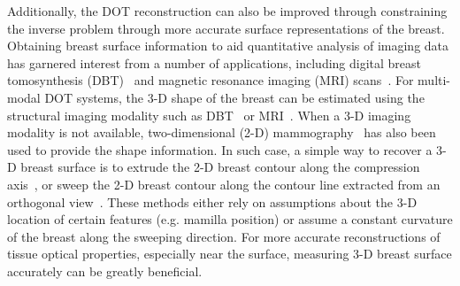 Additionally, the DOT reconstruction can also be improved through constraining the inverse problem through more accurate surface representations of the breast. Obtaining breast surface information to aid quantitative analysis of imaging data has garnered interest from a number of applications, including digital breast tomosynthesis (DBT)~\cite{Rodriguez2017} and magnetic resonance imaging (MRI) scans~\cite{Pallone2014, Ortiz2012}. For multi-modal DOT systems, the 3-D shape of the breast can be estimated using the structural imaging modality such as DBT~\cite{Fang2011} or MRI~\cite{Brooksby2006}. When a 3-D imaging modality is not available, two-dimensional (2-D) mammography~\cite{Deng2015a} has also been used to provide the shape information. In such case, a simple way to recover a 3-D breast surface is to extrude the 2-D breast contour along the compression axis~\cite{Kruger2013, Kalbhen1999}, or sweep the 2-D breast contour along the contour line extracted from an orthogonal view~\cite{Kita1998}. These methods either rely on assumptions about the 3-D location of certain features (e.g. mamilla position) or assume a constant curvature of the breast along the sweeping direction. For more accurate reconstructions of tissue optical properties, especially near the surface, measuring 3-D breast surface accurately can be greatly beneficial.

